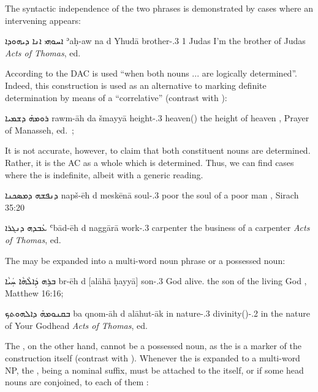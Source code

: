 {{{{The syntactic independence of the two phrases is demonstrated by cases where an intervening  appears: 

{ܐܚܘܗܝ ܐܢܐ ܕܝܗܘܕܐ}
{ʾaḥ-aw \cb{}na d\cb{} Yhudā}
{brother-\poss.3\masc{} \cb{}1\sg{} \lnk\cb{} Judas}
{I'm the brother of Judas}
{\textit{Acts of Thomas}, ed.\ \cite[]{WrightActs}}

According to \citet[61f.]{MuraokaSyriac} the DAC   is used \enquote{when both nouns ... are logically determined}. Indeed, this construction is used as an alternative to marking definite determination by means of a \enquote{correlative}  (contrast with ):

{ܪܘܡܗ̇ ܕܫܡܝܐ}
{rawm-āh da\cb{} šmayyā}
{height-\poss.3\fem{} \lnk\cb{} heaven(\fem)}
{the height of heaven}
{\Pesh, Prayer of Manasseh, ed.\ \cite[B9]{BaarsSchneider}; \cite[90 (7B)]{GutmanVanPeursen}}

It is not accurate, however, to claim that both constituent nouns are determined. Rather, it is the AC as a whole which is determined. Thus, we can find cases where the \secn is indefinite, albeit with a generic reading. 

{ܕܢܦܫܗ ܕܡܣܟܢܐ}
{napš-ēh d\cb{} meskēnā}
{soul-\poss.3\masc{} \lnk\cb{} poor}
{the soul of a poor man}
{\Pesh, Sirach 35:20 \apud \cite[207]{PeursenBenSira}}

{ܥ̇ܒܕܗ ܕܢܓܪܐ}
{ʿbād-ēh d\cb{} naggārā}
{work-\poss.3\masc{} \lnk\cb{} carpenter}
{the business of a carpenter}
{\textit{Acts of Thomas}, ed.\ \cite[]{WrightActs}}



The \secn may be expanded into a multi-word noun phrase or a possessed noun:

{ܒܪܹܗ ܕܲܐܠܵܗܵܐ ܚܲܝܵܐ}
{br-ēh d\cb{} [alāhā ḥayyā]}
{son-\poss.3\masc{} \lnk\cb{} God alive.\masc}
{the son of the living God}
{\Pesh, Matthew 16:16; \cite[62, \S 73f]{MuraokaSyriac}}

{ܒܩܢܘܡܗ̇ ܕܐܠܗܘܬ\hspace{-0.3ex}ܟ}
{ba\cb{} qnom-āh d\cb{} alāhut-āk}
{in\cb{} nature-\poss.3\fem{} \lnk\cb{} divinity(\fem)-\poss.2\masc}
{in the nature of Your Godhead}
{\textit{Acts of Thomas}, ed.\ \cite[]{WrightActs}}

The \prim, on the other hand, cannot be a possessed noun, as the  is a marker of the construction itself (contrast with ). Whenever the \prim is expanded to a multi-word NP, the , being a nominal suffix, must be attached to the  itself, or if some head nouns are conjoined, to each of them \citep[cf.][340, \S 359b]{DuvalSyriaque}:

}}}}
